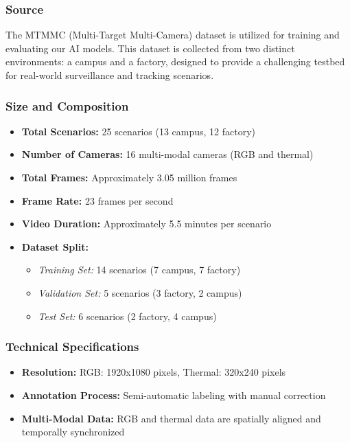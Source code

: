 \subsubsection{Source}
\label{subsubsection:dataset-source}

The MTMMC (Multi-Target Multi-Camera) dataset is utilized for training and evaluating our AI models. This dataset is collected from two distinct environments: a campus and a factory, designed to provide a challenging testbed for real-world surveillance and tracking scenarios.

\subsubsection{Size and Composition}
\label{subsubsection:dataset-composition}

\begin{itemize}
    \item \textbf{Total Scenarios:} 25 scenarios (13 campus, 12 factory)
    \item \textbf{Number of Cameras:} 16 multi-modal cameras (RGB and thermal)
    \item \textbf{Total Frames:} Approximately 3.05 million frames
    \item \textbf{Frame Rate:} 23 frames per second
    \item \textbf{Video Duration:} Approximately 5.5 minutes per scenario
    \item \textbf{Dataset Split:}
    \begin{itemize}
        \item \textit{Training Set:} 14 scenarios (7 campus, 7 factory)
        \item \textit{Validation Set:} 5 scenarios (3 factory, 2 campus)
        \item \textit{Test Set:} 6 scenarios (2 factory, 4 campus)
    \end{itemize}
\end{itemize}

\subsubsection{Technical Specifications}
\label{subsubsection:dataset-technical-specs}

\begin{itemize}
    \item \textbf{Resolution:} RGB: 1920x1080 pixels, Thermal: 320x240 pixels
    \item \textbf{Annotation Process:} Semi-automatic labeling with manual correction
    \item \textbf{Multi-Modal Data:} RGB and thermal data are spatially aligned and temporally synchronized
\end{itemize}


